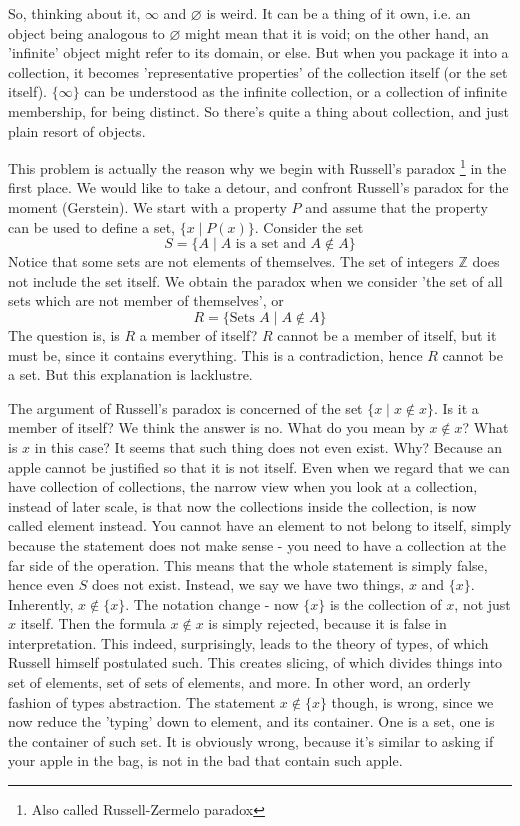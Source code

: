So, thinking about it, $\infty$ and $\varnothing$ is weird. It can be a thing of it own, i.e. an object being analogous to $\varnothing$ might mean that it is void; on the other hand, an 'infinite' object might refer to its domain, or else. But when you package it into a collection, it becomes 'representative properties' of the collection itself (or the set itself). $\{\infty\}$ can be understood as the infinite collection, or a collection of infinite membership, for being distinct. So there's quite a thing about collection, and just plain resort of objects. 

This problem is actually the reason why we begin with Russell's paradox \footnote{Also called Russell-Zermelo paradox} in the first place. We would like to take a detour, and confront Russell's paradox for the moment (Gerstein). We start with a property $P$ and assume that the property can be used to define a set, $\{x\mid P(x)\}$. Consider the set 
\begin{equation*}
    S=\{A\mid A \text{ is a set and } A\not\in A\}
\end{equation*}
Notice that some sets are not elements of themselves. The set of integers $\mathbb{Z}$ does not include the set itself. We obtain the paradox when we consider 'the set of all sets which are not member of themselves', or 
\begin{equation*}
    R= \{\text{Sets } A \mid A \not\in A\}
\end{equation*}
The question is, is $R$ a member of itself? $R$ cannot be a member of itself, but it must be, since it contains everything. This is a contradiction, hence $R$ cannot be a set. But this explanation is lacklustre. 

The argument of Russell's paradox is concerned of the set $\{x\mid x\not\in x\}$. Is it a member of itself? We think the answer is no. What do you mean by $x\not\in x$? What is $x$ in this case? It seems that such thing does not even exist. Why? Because an apple cannot be justified so that it is not itself. Even when we regard that we can have collection of collections, the narrow view when you look at a collection, instead of later scale, is that now the collections inside the collection, is now called element instead. You cannot have an element to not belong to itself, simply because the statement does not make sense - you need to have a collection at the far side of the operation. This means that the whole statement is simply false, hence even $S$ does not exist. Instead, we say we have two things, $x$ and $\{x\}$. Inherently, $x\not\in \{x\}$. The notation change - now $\{x\}$ is the collection of $x$, not just $x$ itself. Then the formula $x\not\in x$ is simply rejected, because it is false in interpretation. This indeed, surprisingly, leads to the theory of types, of which Russell himself postulated such. This creates slicing, of which divides things into set of elements, set of sets of elements, and more. In other word, an orderly fashion of types abstraction. The statement $x\not\in \{x\}$ though, is wrong, since we now reduce the 'typing' down to element, and its container. One is a set, one is the container of such set. It is obviously wrong, because it's similar to asking if your apple in the bag, is not in the bad that contain such apple. 

